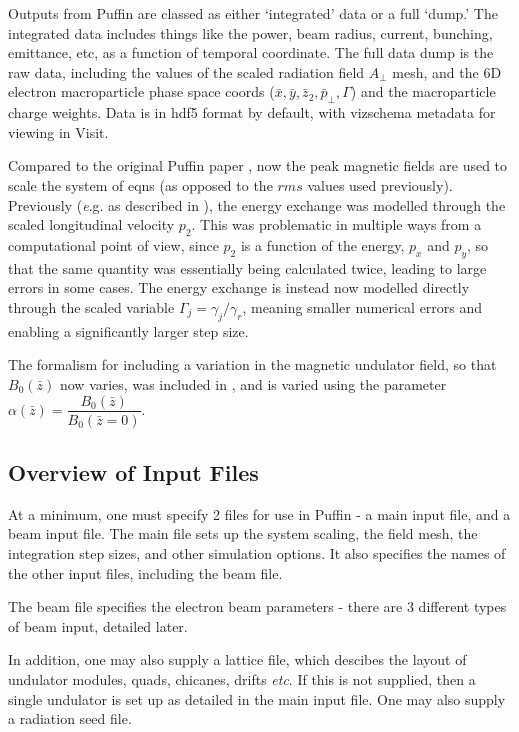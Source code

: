 \documentclass[12pt]{article}%
\begin{document}
Outputs from Puffin are classed as either `integrated' data or a full `dump.' The integrated data includes things like the power, beam radius, current, bunching, emittance, etc, as a function of temporal coordinate. The full data dump is the raw data, including the values of the scaled radiation field $A_\bot$ mesh, and the $6$D electron macroparticle phase space coords ($\bar{x}, \bar{y}, \bar{z}_2, \bar{p}_\bot, \Gamma$) and the macroparticle charge weights. Data is in hdf5 format by default, with vizschema metadata for viewing in Visit.

Compared to the original Puffin paper \cite{puffin}, now the peak magnetic fields are used to scale the system of eqns (as opposed to the $rms$ values used previously). Previously (\textit e.g. as described in \cite{puffin}), the energy exchange was modelled through the scaled longitudinal velocity $p_2$. This was problematic in multiple ways from a computational point of view, since $p_2$ is a function of the energy, $p_x$ and $p_y$, so that the same quantity was essentially being calculated twice, leading to large errors in some cases. The energy exchange is instead now modelled directly through the scaled variable $\Gamma_j = \gamma_j / \gamma_r$, meaning smaller numerical errors and enabling a significantly larger step size.

The formalism for including a variation in the magnetic undulator field, so that $B_0(\bar{z})$ now varies, was included in \cite{2col}, and is varied using the parameter $\alpha(\bar{z}) = \dfrac{B_0(\bar{z})}{B_0(\bar{z}=0)}$.

\subsection{Overview of Input Files}

At a minimum, one must specify 2 files for use in Puffin - a main input file, and a beam input file. The main file sets up the system scaling, the field mesh, the integration step sizes, and other simulation options. It also specifies the names of the other input files, including the beam file.

The beam file specifies the electron beam parameters - there are 3 different types of beam input, detailed later.

In addition, one may also supply a lattice file, which descibes the layout of undulator modules, quads, chicanes, drifts \textit{etc}. If this is not supplied, then a single undulator is set up as detailed in the main input file. One may also supply a radiation seed file.
\end{document}
